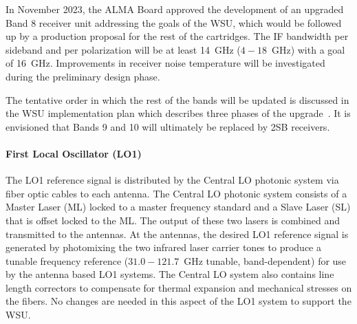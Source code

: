 In November 2023, the ALMA Board approved the development of an upgraded Band 8 receiver unit addressing the goals of the WSU, which would be followed up by a production proposal for the rest of the cartridges. The IF bandwidth per sideband and per polarization will be at least 14~GHz ($4-18$~GHz) with a goal of 16~GHz. Improvements in receiver noise temperature will be investigated during the preliminary design phase.

The tentative order in which the rest of the bands will be updated is discussed in the WSU implementation plan which describes three phases of the upgrade~\cite{imp_plan}.  It is envisioned that Bands 9 and 10 will ultimately be replaced by 2SB receivers.  


\paragraph{First Local Oscillator (LO1)}
The LO1 reference signal is distributed by the Central LO photonic system via fiber optic cables to each antenna. The Central LO photonic system consists of a Master Laser (ML) locked to a master frequency standard and a Slave Laser (SL) that is offset locked to the ML. The output of these two lasers is combined and transmitted to the antennas. At the antennas, the desired LO1 reference signal is generated by photomixing the two infrared laser carrier tones to produce a tunable frequency reference ($31.0-121.7$~GHz tunable, band-dependent) for use by the antenna based LO1 systems. The Central LO system also contains line length correctors to compensate for thermal expansion and mechanical stresses on the fibers. No changes are needed in this aspect of the LO1 system to support the WSU.

